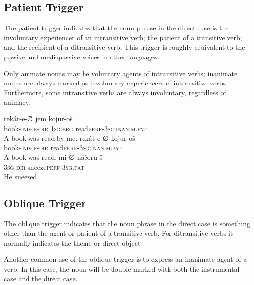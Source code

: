 \documentclass[grammar]{subfiles}
\begin{document}

\subsection{Patient Trigger}
\label{ssec:vp_pat_trigger}

The patient trigger indicates that the noun phrase in the direct case is the
involuntary experiencer of an intransitive verb; the patient of a transitive
verb; and the recipient of a ditransitive verb.  This trigger is roughly
equivalent to the passive and mediopassive voices in other languages. 

Only animate nouns may be voluntary agents of intransitive verbs; inanimate
nouns are always marked as involuntary experiencers of intransitive verbs.
Furthermore, some intransitive verbs are always involuntary, regardless of
animacy. 

\begin{exe}
  \ex {}
  \gll rekát-e-∅ jem kojur-oš\\
  book\textsc{-indef-dir} \textsc{1sg.erg} read\textsc{\bs perf-3sg;inanim.pat}\\
  \glt A book was read by me.
  \ex {}
  \gll rekát-e-∅ kojur-oš\\
  book\textsc{-indef-dir} read\textsc{\bs perf-3sg;inanim.pat}\\
  \glt A book was read.
  \ex {}
  \gll mi-∅ náčoru-š\\
  \textsc{3sg-dir} sneeze\textsc{\bs perf-3sg.pat}\\
  \glt He sneezed.
\end{exe}

\subsection{Oblique Trigger}
\label{ssec:vp_obl_trigger}

The oblique trigger indicates that the noun phrase in the direct case is
something other than the agent or patient of a transitive verb.  For
ditransitive verbs it normally indicates the theme or direct object.

Another common use of the oblique trigger is to express an inanimate agent of a
verb. In this case, the noun will be double-marked with both the instrumental
case and the direct case. 
\end{document}
